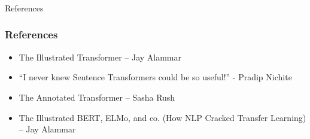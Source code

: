 \begin{frame}[fragile]\frametitle{}
\begin{center}
{\Large References}
\end{center}
\end{frame}

\begin{frame}[fragile]\frametitle{References}
		\begin{itemize}
		\item The Illustrated Transformer – Jay Alammar
		\item ``I never knew Sentence Transformers could be so useful!'' - Pradip Nichite
		\item The Annotated Transformer – Sasha Rush
		\item The Illustrated BERT, ELMo, and co. (How NLP Cracked Transfer Learning) – Jay Alammar
		\end{itemize}
\end{frame}



